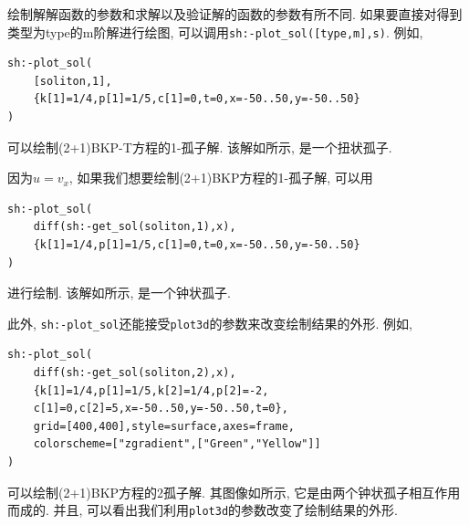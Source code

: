 绘制解解函数的参数和求解以及验证解的函数的参数有所不同. 如果要直接对得到类型为type的m阶解进行绘图, 可以调用\texttt{sh:-plot\_sol([type,m],s)}. 例如, 
\begin{verbatim}
sh:-plot_sol(
    [soliton,1],
    {k[1]=1/4,p[1]=1/5,c[1]=0,t=0,x=-50..50,y=-50..50}
)
\end{verbatim}
可以绘制(2+1)BKP-T方程的1-孤子解. 该解如所示, 是一个扭状孤子.

因为$u=v_x$, 如果我们想要绘制(2+1)BKP方程的1-孤子解, 可以用 
\begin{verbatim}
sh:-plot_sol(
    diff(sh:-get_sol(soliton,1),x),
    {k[1]=1/4,p[1]=1/5,c[1]=0,t=0,x=-50..50,y=-50..50}
)
\end{verbatim} 
进行绘制. 该解如所示, 是一个钟状孤子.

此外, \texttt{sh:-plot\_sol}还能接受\texttt{plot3d}的参数来改变绘制结果的外形. 例如, 
\begin{verbatim}
sh:-plot_sol(
    diff(sh:-get_sol(soliton,2),x),
    {k[1]=1/4,p[1]=1/5,k[2]=1/4,p[2]=-2,
    c[1]=0,c[2]=5,x=-50..50,y=-50..50,t=0},
    grid=[400,400],style=surface,axes=frame,
    colorscheme=["zgradient",["Green","Yellow"]]
)
\end{verbatim} 
可以绘制(2+1)BKP方程的2孤子解. 其图像如所示, 它是由两个钟状孤子相互作用而成的. 并且, 可以看出我们利用\texttt{plot3d}的参数改变了绘制结果的外形.

